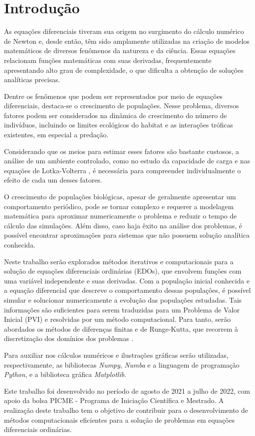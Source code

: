 \section{Introdução}\label{sec:context}

As equações diferenciais tiveram sua origem no surgimento do cálculo numérico de Newton e, desde então, têm sido amplamente utilizadas na criação de modelos matemáticos de diversos fenômenos da natureza e da ciência. Essas equações relacionam funções matemáticas com suas derivadas, frequentemente apresentando alto grau de complexidade, o que dificulta a obtenção de soluções analíticas precisas.

Dentre os fenômenos que podem ser representados por meio de equações diferenciais, destaca-se o crescimento de populações. Nesse problema, diversos fatores podem ser considerados na dinâmica de crescimento do número de indivíduos, incluindo os limites ecológicos do habitat e as interações tróficas existentes, em especial a predação.

Considerando que os meios para estimar esses fatores são bastante custosos, a análise de um ambiente controlado, como no estudo da capacidade de carga e nas equações de Lotka-Volterra \cite{goel1971}, é necessária para compreender individualmente o efeito de cada um desses fatores.

O crescimento de populações biológicas, apesar de geralmente apresentar um comportamento periódico, pode se tornar complexo e requerer a modelagem matemática para aproximar numericamente o problema e reduzir o tempo de cálculo das simulações. Além disso, caso haja êxito na análise dos problemas, é possível encontrar aproximações para sistemas que não possuem solução analítica conhecida.

Neste trabalho serão explorados métodos iterativos e computacionais para a solução de equações diferenciais ordinárias (EDOs), que envolvem funções com uma variável independente e suas derivadas. Com a população inicial conhecida e a equação diferencial que descreve o comportamento dessas populações, é possível simular e solucionar numericamente a evolução das populações estudadas. Tais informações são suficientes para serem traduzidas para um Problema de Valor Inicial (PVI) e resolvidas por um método computacional. Para tanto, serão abordados os métodos de diferenças finitas e de Runge-Kutta, que recorrem à discretização dos domínios dos problemas \cite{ascher2008numerical}.

Para auxiliar nos cálculos numéricos e ilustrações gráficas serão utilizadas, respectivamente, as bibliotecas \emph{Numpy}, \emph{Numba} e a linguagem de programação \emph{Python}, e a biblioteca gráfica \emph{Matplotlib}.

Este trabalho foi desenvolvido no período de agosto de 2021 a julho de 2022, com apoio da bolsa PICME - Programa de Iniciação Científica e Mestrado. A realização deste trabalho tem o objetivo de contribuir para o desenvolvimento de métodos computacionais eficientes para a solução de problemas em equações diferenciais ordinárias.